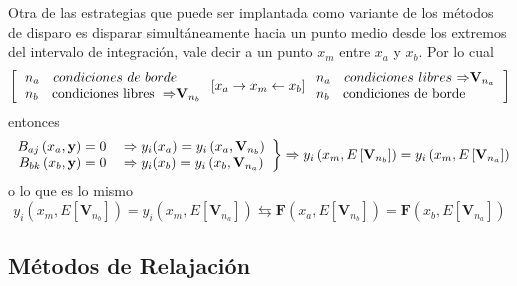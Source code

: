 \documentclass[spanish,titlepage,11pt]{article}
\begin{document}
Otra de las estrategias que puede ser implantada como variante de los
m\'{e}todos de disparo es disparar simult\'{a}neamente hacia un punto medio
desde los extremos del intervalo de integraci\'{o}n, vale decir a un punto
$x_{m}$ entre $x_{a}$ y $x_{b}.$ Por lo cual
\[
\left[  \left.
\begin{array}
[c]{l}%
n_{a}\quad{\normalsize condiciones\ de\ borde}\\
n_{b}\quad\mathrm{condiciones\ libres\ \Rightarrow}\mathbf{V}_{n_{b}}%
\end{array}
\right.  \left[  x_{a}\rightarrow x_{m}\leftarrow x_{b}\right]  \left.
\begin{array}
[c]{l}%
n_{a}\quad{\normalsize condiciones\ libres}\mathrm{\ \Rightarrow}%
\mathbf{V}_{n_{a}}\\
n_{b}\quad\mathrm{condiciones\ de\ borde}%
\end{array}
\right.  \right]
\]
entonces
\[
\left.
\begin{array}
[c]{c}%
B_{aj}\left(  x_{a},\mathbf{y}\right)  =0\quad\Rightarrow y_{i}(x_{a}%
)=y_{i}\left(  x_{a},\mathbf{V}_{n_{b}}\right) \\
B_{bk}\left(  x_{b},\mathbf{y}\right)  =0\quad\Rightarrow y_{i}(x_{b}%
)=y_{i}\left(  x_{b},\mathbf{V}_{n_{a}}\right)
\end{array}
\right\}  \Rightarrow y_{i}\left(  x_{m},E\left[  \mathbf{V}_{n_{b}}\right]
\right)  =y_{i}\left(  x_{m},E\left[  \mathbf{V}_{n_{a}}\right]  \right)
\]
o lo que es lo mismo
\[
y_{i}\left(  x_{m},E\left[  \mathbf{V}_{n_{b}}\right]  \right)  =y_{i}\left(
x_{m},E\left[  \mathbf{V}_{n_{a}}\right]  \right)  \leftrightarrows
\mathbf{F}\left(  x_{a},E\left[  \mathbf{V}_{n_{b}}\right]  \right)
=\mathbf{F}\left(  x_{b},E\left[  \mathbf{V}_{n_{a}}\right]  \right)
\]

\subsection{M\'{e}todos de Relajaci\'{o}n}
\end{document}
